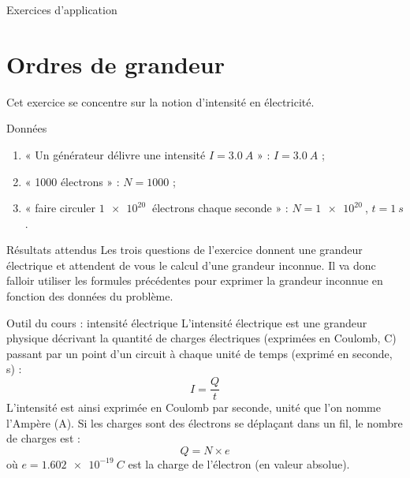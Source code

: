 \documentclass[10pt,a5paper,notitlepage]{book}
\begin{document}
\begin{center}
    \Huge Exercices d'application
\end{center}

\section{Ordres de grandeur}

Cet exercice se concentre sur la notion d'intensité en électricité.

\begin{NCdefi}{Données}
	\begin{enumerate}
        \item « Un générateur délivre une intensité $I = \SI{3.0}{A}$ » :
            $I = \SI{3.0}{A}$ ;
		\item « 1000 électrons » : $N = 1000$ ;
        \item « faire circuler $\SI{1e20}{}$ électrons chaque seconde » : $N =
            \SI{1e20}{}$, $t = \SI{1}{s}$.
	\end{enumerate}
\end{NCdefi}

\begin{NCprop}{Résultats attendus}
    Les trois questions de l'exercice donnent une grandeur électrique et
    attendent de vous le calcul d'une grandeur inconnue. Il va donc falloir
    utiliser les formules précédentes pour exprimer la grandeur inconnue en
    fonction des données du problème.
\end{NCprop}

\begin{NCdemo}{Outil du cours : intensité électrique}
    L'intensité électrique est une grandeur physique décrivant la quantité de
    charges électriques (exprimées en Coulomb, C) passant par un point d'un
    circuit à chaque unité de temps (exprimé en seconde, s) :
	\begin{equation}
		I = \dfrac{Q}{t} \label{eq:1.1.intensite}
	\end{equation}
    L'intensité est ainsi exprimée en Coulomb par seconde, unité que l'on nomme
    l'Ampère (A). Si les charges sont des électrons se déplaçant dans un fil, le
    nombre de charges est :
	\begin{equation}
		Q = N\times e \label{eq:1.1.charge}
	\end{equation}
    où $e = \SI{1.602e-19}{C}$ est la charge de l'électron (en valeur
    absolue).
\end{NCdemo}
\end{document}
